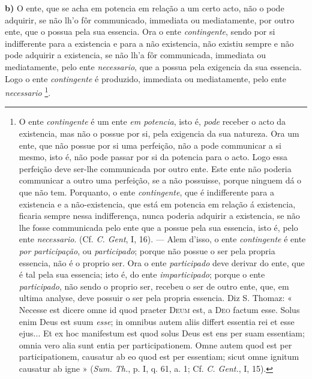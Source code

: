 \textbf{b)} O ente, que se acha em potencia em relação a um certo acto, não o pode adquirir, se não lh'o fôr communicado, immediata ou mediatamente, por outro ente, que o possua pela sua essencia. Ora o ente \emph{contingente}, sendo por si indifferente para a existencia e para a não existencia, não existiu sempre e não pode adquirir a existencia, se não lh'a fôr communicada, immediata ou mediatamente, pelo ente \emph{necessario}, que a possua pela exigencia da sua essencia. Logo o ente \emph{contingente} é produzido, immediata ou mediatamente, pelo ente \emph{necessario} \footnote{O ente \emph{contingente} é um ente \emph{em potencia}, isto é, \emph{pode} receber o acto da existencia, mas não o possue por si, pela exigencia da sua natureza. Ora um ente, que não possue por si uma perfeição, não a pode communicar a si mesmo, isto é, não pode passar por si da potencia para o acto. Logo essa perfeição deve ser-lhe communicada por outro ente. Este ente não poderia communicar a outro uma perfeição, se a não possuisse, porque ninguem dá o que não tem. Porquanto, o ente \emph{contingente}, que é indifferente para a existencia e a não-existencia, que está em potencia em relação á existencia, ficaria sempre nessa indifferença, nunca poderia adquirir a existencia, se não lhe fosse communicada pelo ente que a possue pela sua essencia, isto é, pelo ente \emph{necessario}. (Cf. \emph{C. Gent}, I, 16). --- Alem d'isso, o ente \emph{contingente} é ente \emph{por participação}, ou \emph{participado}; porque não possue o ser pela propria essencia, não é o proprio ser. Ora o ente \emph{participado} deve derivar do ente, que é tal pela sua essencia; isto é, do ente \emph{imparticipado}; porque o ente \emph{participado}, não sendo o proprio ser, recebeu o ser de outro ente, que, em ultima analyse, deve possuir o ser pela propria essencia. Diz S. Thomaz: « Necesse est dicere omne id quod praeter \textsc{Deum} est, a \textsc{Deo} factum esse. Solus enim Deus est suum \emph{esse}; in omnibus autem aliis differt essentia rei et esse ejus... Et ex hoc manifestum est quod solus Deus est ens per suam essentiam; omnia vero alia sunt entia per participationem. Omne autem quod est per participationem, causatur ab eo quod est per essentiam; sicut omne ignitum causatur ab igne » (\emph{Sum. Th.}, p. I, q. 61, a. 1; Cf. \emph{C. Gent.}, I, 15).}.
